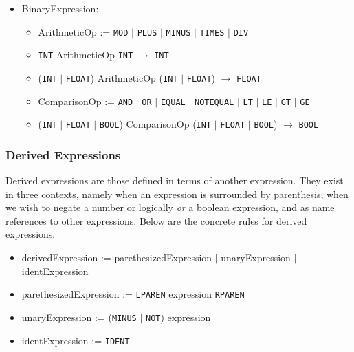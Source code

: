 \begin{itemize}
	\item BinaryExpression:
		\begin{itemize}
			\item ArithmeticOp := \texttt{MOD} $|$ \texttt{PLUS} $|$ \texttt{MINUS} $|$ \texttt{TIMES} $|$ \texttt{DIV}
			\item \texttt{INT} ArithmeticOp \texttt{INT} $\to$ \texttt{INT}
			\item (\texttt{INT} $|$ \texttt{FLOAT}) ArithmeticOp (\texttt{INT} $|$ \texttt{FLOAT}) $\to$ \texttt{FLOAT}
			\item ComparisonOp := \texttt{AND} $|$ \texttt{OR} $|$ \texttt{EQUAL} $|$ \texttt{NOTEQUAL} $|$ \texttt{LT} $|$ \texttt{LE} $|$ \texttt{GT} $|$ \texttt{GE}
			\item (\texttt{INT} $|$ \texttt{FLOAT} $|$ \texttt{BOOL}) ComparisonOp (\texttt{INT} $|$ \texttt{FLOAT} $|$ \texttt{BOOL}) $\to$ \texttt{BOOL}
		\end{itemize}
\end{itemize}

\subsubsection{Derived Expressions}

Derived expressions are those defined in terms of another expression. They exist in three contexts, namely when an expression is surrounded by parenthesis, when we wish to negate a number or logically \emph{or} a boolean expression, and as name references to other expressions. Below are the concrete rules for derived expressions.

\begin{itemize}
	\item derivedExpression := parethesizedExpression $|$ unaryExpression $|$ identExpression
	\item parethesizedExpression := \texttt{LPAREN} expression \texttt{RPAREN}
	\item unaryExpression := (\texttt{MINUS} $|$ \texttt{NOT}) expression
	\item identExpression := \texttt{IDENT}
\end{itemize}

